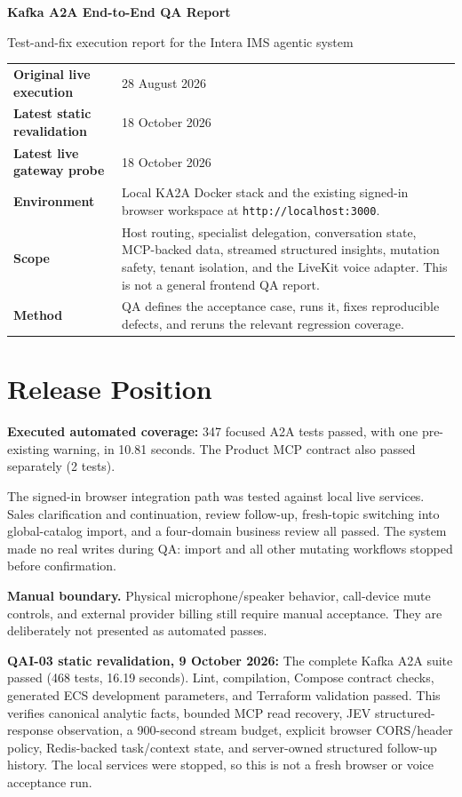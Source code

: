 \documentclass[10pt]{article}
\begin{document}
{\color{navy}\Huge\bfseries Kafka A2A End-to-End QA Report\par}
\vspace{5pt}
{\large\color{blue}Test-and-fix execution report for the Intera IMS agentic system\par}
\vspace{12pt}

\begin{tabularx}{\textwidth}{>{\bfseries\color{navy}}l X}
Original live execution & 28 August 2026 \\
Latest static revalidation & 18 October 2026 \\
Latest live gateway probe & 18 October 2026 \\
Environment & Local KA2A Docker stack and the existing signed-in browser workspace at \texttt{http://localhost:3000}. \\
Scope & Host routing, specialist delegation, conversation state, MCP-backed data, streamed structured insights, mutation safety, tenant isolation, and the LiveKit voice adapter. This is not a general frontend QA report. \\
Method & QA defines the acceptance case, runs it, fixes reproducible defects, and reruns the relevant regression coverage. \\
\end{tabularx}

\section{Release Position}
\colorbox{mist}{\parbox{0.96\textwidth}{\textbf{Executed automated coverage:} 347 focused A2A tests passed, with one pre-existing warning, in 10.81 seconds. The Product MCP contract also passed separately (2 tests).}}

The signed-in browser integration path was tested against local live services. Sales clarification and continuation, review follow-up, fresh-topic switching into global-catalog import, and a four-domain business review all passed. The system made no real writes during QA: import and all other mutating workflows stopped before confirmation.

\textbf{Manual boundary.} Physical microphone/speaker behavior, call-device mute controls, and external provider billing still require manual acceptance. They are deliberately not presented as automated passes.

\colorbox{mist}{\parbox{0.96\textwidth}{\textbf{QAI-03 static revalidation, 9 October 2026:} The complete Kafka A2A suite passed (468 tests, 16.19 seconds). Lint, compilation, Compose contract checks, generated ECS development parameters, and Terraform validation passed. This verifies canonical analytic facts, bounded MCP read recovery, JEV structured-response observation, a 900-second stream budget, explicit browser CORS/header policy, Redis-backed task/context state, and server-owned structured follow-up history. The local services were stopped, so this is not a fresh browser or voice acceptance run.}}
\end{document}

